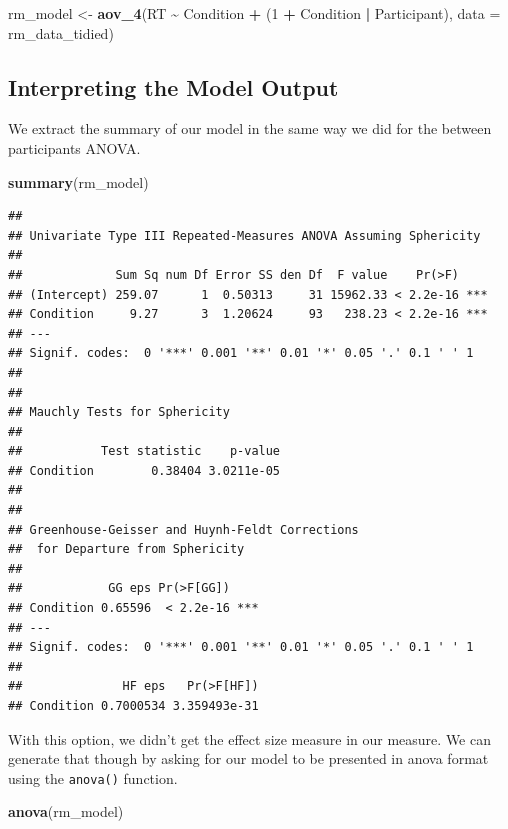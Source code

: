 \documentclass[
]{book}
\newenvironment{Shaded}{\begin{snugshade}}{\end{snugshade}}
\newcommand{\AttributeTok}[1]{\textcolor[rgb]{0.13,0.29,0.53}{#1}}
\newcommand{\DecValTok}[1]{\textcolor[rgb]{0.00,0.00,0.81}{#1}}
\newcommand{\FunctionTok}[1]{\textcolor[rgb]{0.13,0.29,0.53}{\textbf{#1}}}
\newcommand{\NormalTok}[1]{#1}
\newcommand{\OtherTok}[1]{\textcolor[rgb]{0.56,0.35,0.01}{#1}}
\newcommand{\SpecialCharTok}[1]{\textcolor[rgb]{0.81,0.36,0.00}{\textbf{#1}}}
\begin{document}
\begin{Shaded}
\begin{Highlighting}[]
\NormalTok{rm\_model }\OtherTok{\textless{}{-}} \FunctionTok{aov\_4}\NormalTok{(RT }\SpecialCharTok{\textasciitilde{}}\NormalTok{ Condition }\SpecialCharTok{+}\NormalTok{ (}\DecValTok{1} \SpecialCharTok{+}\NormalTok{ Condition }\SpecialCharTok{|}\NormalTok{ Participant), }\AttributeTok{data =}\NormalTok{ rm\_data\_tidied)}
\end{Highlighting}
\end{Shaded}

\hypertarget{interpreting-the-model-output-1}{%
\subsection{Interpreting the Model Output}\label{interpreting-the-model-output-1}}

We extract the summary of our model in the same way we did for the between participants ANOVA.

\begin{Shaded}
\begin{Highlighting}[]
\FunctionTok{summary}\NormalTok{(rm\_model)}
\end{Highlighting}
\end{Shaded}

\begin{verbatim}
## 
## Univariate Type III Repeated-Measures ANOVA Assuming Sphericity
## 
##             Sum Sq num Df Error SS den Df  F value    Pr(>F)    
## (Intercept) 259.07      1  0.50313     31 15962.33 < 2.2e-16 ***
## Condition     9.27      3  1.20624     93   238.23 < 2.2e-16 ***
## ---
## Signif. codes:  0 '***' 0.001 '**' 0.01 '*' 0.05 '.' 0.1 ' ' 1
## 
## 
## Mauchly Tests for Sphericity
## 
##           Test statistic    p-value
## Condition        0.38404 3.0211e-05
## 
## 
## Greenhouse-Geisser and Huynh-Feldt Corrections
##  for Departure from Sphericity
## 
##            GG eps Pr(>F[GG])    
## Condition 0.65596  < 2.2e-16 ***
## ---
## Signif. codes:  0 '***' 0.001 '**' 0.01 '*' 0.05 '.' 0.1 ' ' 1
## 
##              HF eps   Pr(>F[HF])
## Condition 0.7000534 3.359493e-31
\end{verbatim}

With this option, we didn't get the effect size measure in our measure. We can generate that though by asking for our model to be presented in anova format using the \texttt{anova()} function.

\begin{Shaded}
\begin{Highlighting}[]
\FunctionTok{anova}\NormalTok{(rm\_model)}
\end{Highlighting}
\end{Shaded}
\end{document}
